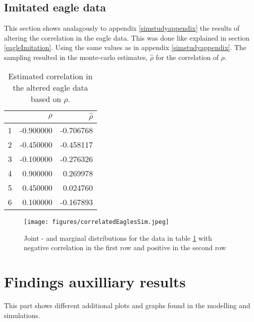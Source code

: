 \subsection{Imitated eagle data}
This section shows analagously to appendix \ref{simstudyappendix} the results of altering the correlation in the eagle data. This was done like explained in section \ref{eagleImitation}. Using the same values as in appendix \ref{simstudyappendix}. The sampling resulted in the monte-carlo estimates, $\hat{\rho}$ for the correlation of $\rho$.
\begin{table}[ht]
    \centering
    \begin{tabular}{rrr}
      \hline
     & $\rho$ & $\hat{\rho}$ \\ 
      \hline
    1 & -0.900000 & -0.706768 \\ 
      2 & -0.450000 & -0.458117 \\ 
      3 & -0.100000 & -0.276326 \\ 
      4 & 0.900000 & 0.269978 \\ 
      5 & 0.450000 & 0.024760 \\ 
      6 & 0.100000 & -0.167893 \\ 
       \hline
    \end{tabular}
    \caption{Estimated correlation in the altered eagle data based on $\rho$.}
    \label{correlatedEagleTable}
    \end{table}

    \begin{figure}[h!]
        \begin{center}
        \texttt{[image: figures/correlatedEaglesSim.jpeg]}
        \caption{Joint - and marginal distributions for the data in table \ref{correlatedEagleTable} with negative correlation in the first row and positive in the second row}
    \end{center}
    \label{correlationEagleDensities}
\end{figure}
\newpage
\section{Findings auxilliary results}\label{auxiliaryResultsModelling}
This part shows different additional plots and graphs found in the modelling and simulations.

